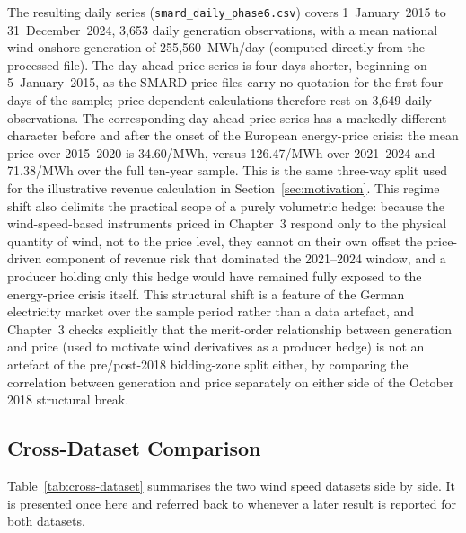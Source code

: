 ﻿\documentclass[11pt, a4paper, twoside]{article}
\begin{document}
The resulting daily series (\texttt{smard\_daily\_phase6.csv}) covers 1~January~2015 to 31~December~2024, 3{,}653 daily generation observations, with a mean national wind onshore generation of 255{,}560~MWh/day (computed directly from the processed file). The day-ahead price series is four days shorter, beginning on 5~January~2015, as the SMARD price files carry no quotation for the first four days of the sample; price-dependent calculations therefore rest on 3{,}649 daily observations. The corresponding day-ahead price series has a markedly different character before and after the onset of the European energy-price crisis: the mean price over 2015--2020 is \texteuro{}34.60/MWh, versus \texteuro{}126.47/MWh over 2021--2024 and \texteuro{}71.38/MWh over the full ten-year sample. This is the same three-way split used for the illustrative revenue calculation in Section~\ref{sec:motivation}. This regime shift also delimits the practical scope of a purely volumetric hedge: because the wind-speed-based instruments priced in Chapter~3 respond only to the physical quantity of wind, not to the price level, they cannot on their own offset the price-driven component of revenue risk that dominated the 2021--2024 window, and a producer holding only this hedge would have remained fully exposed to the energy-price crisis itself. This structural shift is a feature of the German electricity market over the sample period rather than a data artefact, and Chapter~3 checks explicitly that the merit-order relationship between generation and price (used to motivate wind derivatives as a producer hedge) is not an artefact of the pre/post-2018 bidding-zone split either, by comparing the correlation between generation and price separately on either side of the October 2018 structural break.

\subsection{Cross-Dataset Comparison}
\label{sec:data-comparison}

Table~\ref{tab:cross-dataset} summarises the two wind speed datasets side by side. It is presented once here and referred back to whenever a later result is reported for both datasets.
\end{document}
